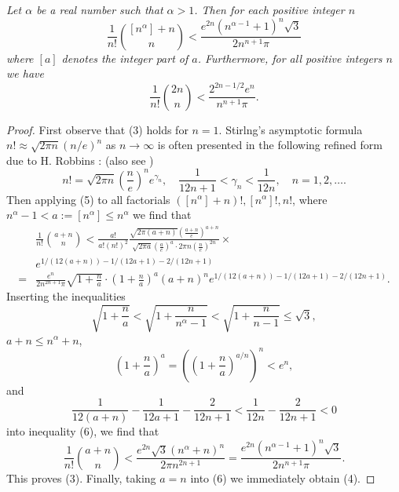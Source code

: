 \documentclass[12pt]{amsart}
\begin{document}
 {\it Let $\alpha$ be a real number such that
$\alpha >1$. Then for each positive integer $n$ 
   \begin{equation}
\frac{1}{n!}{[n^\alpha]+n\choose n}<
\frac{e^{2n}(n^{\alpha-1} +1)^n\sqrt{3}}{2 n^{n+1}\pi}
  \end{equation}
where $[a]$ denotes the integer part of $a$. 
Furthermore, for all positive integers $n$ we have
    \begin{equation}
\frac{1}{n!}{2n\choose n}< \frac{2^{2n-1/2}e^n}{ n^{n+1}\pi}.
   \end{equation}
\begin{proof} First observe that (3) holds for $n=1$.
Stirlng's asymptotic formula 
$n!\approx \sqrt{2\pi n}(n/e)^n$ as $n\to\infty$  is 
often presented in the following refined form due to H. Robbins \cite{ro}:
(also see \cite{mi})
   \begin{equation}
n!=\sqrt{2\pi n}\left(\frac{n}{e}\right)^ne^{\gamma_n},
\quad \frac{1}{12n+1}<\gamma_n<\frac{1}{12n},\quad n=1,2,\ldots.
  \end{equation}
Then applying (5)  to all factorials $(\left[n^\alpha\right]+n)!, 
\left[n^\alpha\right]!, n!$, where 
$n^\alpha -1 <a:=\left[n^\alpha\right]\le n^\alpha$
we find that
 \begin{equation}\begin{split}
&\frac{1}{n!}{a+n\choose n}<
\frac{a!}{a!(n!)^2}
 \frac{\sqrt{2\pi (a+n)}\left(
\frac{a+n}{e}\right)^{a+n}}{\sqrt{2\pi a}\left(
\frac{a}{e}\right)^{a}\cdot 
 2\pi n\left(\frac{n}{e}\right)^{2n}}\times\\
& e^{1/(12(a+n))-1/(12a+1)-2/(12n+1)}\\
=&\frac{e^n}{2 n^{2n+1}\pi}\sqrt{1+\frac{n}{a}}\cdot 
\left(1+\frac{n}{a}\right)^{a}(a +n)^n
e^{1/(12(a+n))-1/(12a+1)-2/(12n+1)}.
  \end{split}\end{equation}
Inserting  the inequalities 
 $$
\sqrt{1+\frac{n}{a}}<\sqrt{1+\frac{n}{n^\alpha -1}}
<\sqrt{1+\frac{n}{n-1}}\le\sqrt{3},
  $$
$a+n\le n^\alpha +n$, 
 $$
\left(1+\frac{n}{a}\right)^a= 
\left(\left(1+\frac{n}{a}\right)^{a/n}\right)^n<e^n, 
 $$
and 
$$
\frac{1}{12(a+n)}-\frac{1}{12a+1}-\frac{2}{12n+1}
<\frac{1}{12n}-\frac{2}{12n+1}<0
 $$
into inequality (6), we find that 
   \begin{equation}
\frac{1}{n!}{a+n\choose n}<
\frac{e^{2n}\sqrt{3}(n^\alpha +n)^n}{2\pi n^{2n+1}}=
\frac{e^{2n}(n^{\alpha-1} +1)^n\sqrt{3}}{2 n^{n+1}\pi}.
   \end{equation}
This proves (3). Finally, taking $a=n$ into (6) we immediately 
obtain (4). 
\end{proof}

}
\end{document}
